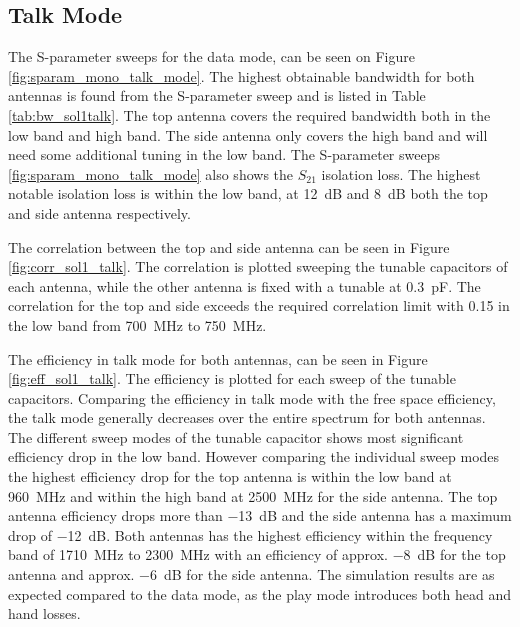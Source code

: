 \FloatBarrier
\subsection{Talk Mode}
The S-parameter sweeps for the data mode, can be seen on Figure \ref{fig:sparam_mono_talk_mode}. The highest obtainable bandwidth for both antennas is found from the S-parameter sweep and is listed in Table \ref{tab:bw_sol1talk}. The top antenna covers the required bandwidth both in the low band and high band. The side antenna only covers the high band and will need some  additional tuning in the low band. The S-parameter sweeps \ref{fig:sparam_mono_talk_mode} also shows the $S_{21}$ isolation loss. The highest notable isolation loss is within the low band, at \SI{12}{dB} and \SI{8}{dB} both the top and side antenna respectively.

The correlation between the top and side antenna can be seen in Figure \ref{fig:corr_sol1_talk}. The correlation is plotted sweeping the tunable capacitors of each antenna, while the other antenna is fixed with a tunable at \SI{0.3}{pF}. The correlation for the top and side exceeds the required correlation limit with 0.15 in the low band from \SI{700}{MHz} to \SI{750}{MHz}.

The efficiency in talk mode for both antennas, can be seen in Figure \ref{fig:eff_sol1_talk}. The efficiency is plotted for each sweep of the tunable capacitors. Comparing the efficiency in talk mode with the free space efficiency, the talk mode generally decreases over the entire spectrum for both antennas. The different sweep modes of the tunable capacitor shows most significant efficiency drop in the low band. However comparing the individual sweep modes the highest efficiency drop for the top antenna is within the low band at \SI{960}{MHz} and within the high band at \SI{2500}{MHz} for the side antenna. The top antenna efficiency drops more than \SI{-13}{dB} and the side antenna has a maximum drop of \SI{-12}{dB}.
Both antennas has the highest efficiency within the frequency band of \SI{1710}{MHz} to \SI{2300}{MHz} with an efficiency of approx. \SI{-8}{dB} for the top antenna and approx. \SI{-6}{dB} for the side antenna. 
The simulation results are as expected compared to the data mode, as the play mode introduces both head and hand losses.

